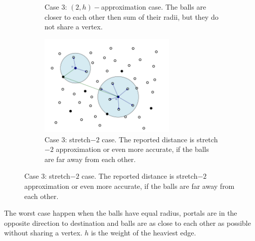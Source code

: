 \documentclass[shortabstract, lic, english]{iithesis}
\theoremstyle{definition} \newtheorem{definition}{Definition}[chapter]
\theoremstyle{plain} \newtheorem{remark}[definition]{Observation}
\theoremstyle{plain} \newtheorem{theorem}[definition]{Theorem}
\theoremstyle{plain} \newtheorem{lemma}[definition]{Lemma}
\theoremstyle{plain} \newtheorem{conjecture}[definition]{Conjecture}
\begin{document}
\begin{figure}[H]
\begin{subfigure}[H]{0.465\textwidth}
        \caption{Case $3$: $(2, h)-$approximation case. The balls are closer to each other then sum of their radii, but they do not share a vertex.}
    \end{subfigure}\hfill%
    \begin{subfigure}[H]{0.465\textwidth}
        \centering
        \includegraphics[width=6.5cm]{images/case_3}
        \caption{Case $3$: stretch$-2$ case. The reported distance is stretch$-2$ approximation or even more accurate, if the balls are far away from each other. }
    \end{subfigure}
\end{figure}

The worst case happen when the balls have equal radius, portals are in the opposite direction to destination and balls are as close to each other as possible without sharing a vertex. $h$ is the weight of the heaviest edge.
\end{document}
